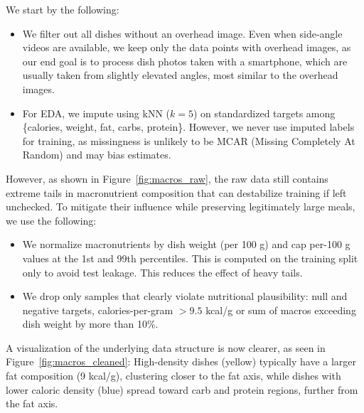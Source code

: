 \documentclass[a4paper]{article}
\begin{document}
            We start by the following:

            \begin{itemize}
                \item We filter out all dishes without an overhead image. Even when side-angle videos are available, we keep only the data points with overhead images, as our end goal is to process dish photos taken with a smartphone, which are usually taken from slightly elevated angles, most similar to the overhead images.

                \item For EDA, we impute using kNN ($k{=}5$) on standardized targets among \{calories, weight, fat, carbs, protein\}. However, we never use imputed labels for training, as missingness is unlikely to be MCAR (Missing Completely At Random) and may bias estimates.
            \end{itemize}


            However, as shown in Figure~\ref{fig:macros_raw}, the raw data still contains extreme tails in macronutrient composition that can destabilize training if left unchecked. To mitigate their influence while preserving legitimately large meals, we use the following:

            \begin{itemize}
                \item We normalize macronutrients by dish weight (per 100 g) and cap per-100 g values at the 1st and 99th percentiles. This is computed on the training split only to avoid test leakage. This reduces the effect of heavy tails.
                \item We drop only samples that clearly violate nutritional plausibility: null and negative targets, calories-per-gram $> 9.5$ kcal/g or sum of macros exceeding dish weight by more than 10\%.
            \end{itemize}

            A visualization of the underlying data structure is now clearer, as seen in Figure~\ref{fig:macros_cleaned}: 
            High-density dishes (yellow) typically have a larger fat composition (9 kcal/g), clustering closer to the fat axis, while dishes with lower caloric density (blue) spread toward carb and protein regions, further from the fat axis.
\end{document}
